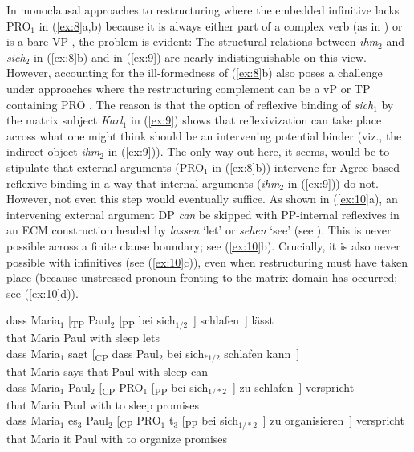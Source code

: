 \documentclass[output=paper]{langsci/langscibook}
\begin{document}
In monoclausal approaches to restructuring where the embedded infinitive lacks
PRO$_1$ in (\ref{ex:8}a,b) because it is always either part of a complex verb
(as in \citealt{Haider:10}) or is a bare VP \parencite{Sternefeld:06}, the
problem is evident: The structural relations between {\itshape ihm}$_2$ and {\it
sich}$_2$ in (\ref{ex:8}b) and in (\ref{ex:9}) are nearly indistinguishable on
this view.  However, accounting for the ill-formedness of (\ref{ex:8}b) also
poses a challenge under approaches where the restructuring complement can be a
vP or TP containing PRO \parencite{Wurmbrand:01}. The reason is that the option of
reflexive binding of {\itshape sich}$_1$ by the matrix subject {\itshape Karl}$_1$ in
(\ref{ex:9}) shows that reflexivization can take place across what one might
think should be an intervening potential binder (viz., the indirect object {\it
ihm}$_2$ in (\ref{ex:9})). The only way out here, it seems, would be to
stipulate that external arguments (PRO$_1$ in (\ref{ex:8}b)) intervene for
Agree-based reflexive binding in a way that internal arguments ({\itshape ihm}$_2$
in (\ref{ex:9})) do not. However, not even this step would eventually suffice.
As shown in (\ref{ex:10}a), an intervening external argument DP {\itshape can} be
skipped with PP-internal reflexives in an ECM construction headed by {\it
lassen} \enquote*{let} or {\itshape sehen} \enquote*{see} (see
\citealt{Reis:76,Grewendorf:83,Fanselow:87,Gunkel:03:inf,Barnickel:14}). This
is never possible across a finite clause boundary; see (\ref{ex:10}b).
Crucially, it is also never possible with  infinitives (see
(\ref{ex:10}c)), even when restructuring must have taken place (because
unstressed pronoun fronting to the matrix domain has occurred; see
(\ref{ex:10}d)).\newpage

\ea\label{ex:10} 
    \ea \gll dass Maria$_1$ [\textsubscript{TP} Paul$_2$ [\textsubscript{PP} bei sich$_{1/2}$~] schlafen~] lässt\\
    that Maria\textsubscript{\Nom}  {} Paul\textsubscript{\Acc} {} with \Refl{} sleep lets\\
    \ex \gll dass Maria$_1$ sagt [\textsubscript{CP} dass Paul$_2$ bei sich$_{*1/2}$ schlafen
      kann~]\\
    that Maria\textsubscript{\Nom} says {} that Paul\textsubscript{\Nom} with \Refl{} sleep can\\
    \ex \gll dass Maria$_1$ Paul$_2$ [\textsubscript{CP} PRO$_1$ [\textsubscript{PP} bei sich$_{1/*2}$~] zu schlafen~]
    verspricht\\
    that Maria\textsubscript{\Nom} Paul\textsubscript{\Dat} {} {} {}  with \Refl{} to sleep
    promises\\
    \ex \gll dass Maria$_1$ es$_3$ Paul$_2$ [\textsubscript{CP} PRO$_1$ t$_3$ [\textsubscript{PP} bei sich$_{1/*2}$~] zu
      organisieren~] verspricht\\
    that Maria\textsubscript{\Nom} it\textsubscript{\Acc} Paul\textsubscript{\Dat} {} {} {} {} with \Refl{} to organize promises\\
    \z
\z
\end{document}
